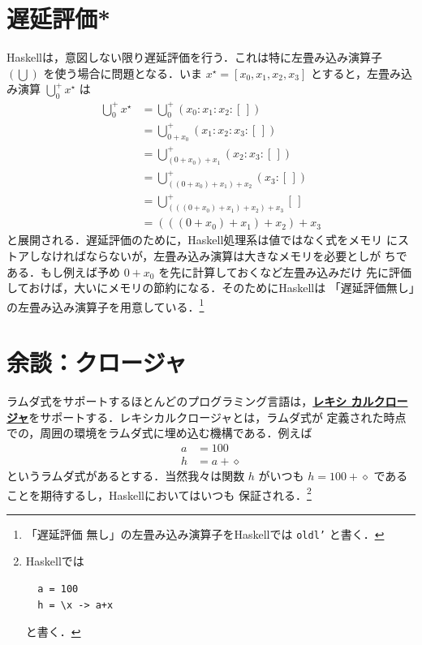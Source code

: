 \documentclass[a5paper,twoside,fleqn,draft]{jsbook}
\newcommand{\programminglanguage}[1]{\textsf{#1}}
\newcommand{\haskell}{\programminglanguage{Haskell}}
\newcommand{\keyword}[1]{{\underline{\textbf{#1}}}}
\newcommand{\code}[1]{\texttt{#1}}
\newcommand{\mEmptyList}{{[\,]}}
\newcommand{\mAnonParam}{\diamond}
\DeclareMathOperator*{\mFold}{\bigcup}
\newcommand{\mList}[1]{{#1}^\mathrm{\star}}
\begin{document}
\section{遅延評価*}

\haskell は，意図しない限り遅延評価を行う．これは特に左畳み込み演算子
$(\mFold)$ を使う場合に問題となる．いま
$\mList{x}=[x_0,x_1,x_2,x_3]$ とすると，左畳み込み演算
$\mFold^+_0\mList{x}$ は
\begin{align}
  \mFold^+_0\mList{x}
  &=\mFold^+_0{}(x_0:x_1:x_2:\mEmptyList)\\
  &=\mFold^+_{0+x_0}{}(x_1:x_2:x_3:\mEmptyList)\\
  &=\mFold^+_{(0+x_0)+x_1}{}(x_2:x_3:\mEmptyList)\\
  &=\mFold^+_{((0+x_0)+x_1)+x_2}{}(x_3:\mEmptyList)\\
  &=\mFold^+_{(((0+x_0)+x_1)+x_2)+x_3}{}\mEmptyList\\
  &=(((0+x_0)+x_1)+x_2)+x_3
\end{align}
と展開される．遅延評価のために，\haskell 処理系は値ではなく式をメモリ
にストアしなければならないが，左畳み込み演算は大きなメモリを必要としが
ちである．もし例えば予め $0+x_0$ を先に計算しておくなど左畳み込みだけ
先に評価しておけば，大いにメモリの節約になる．そのために\haskell は
「遅延評価無し」の左畳み込み演算子を用意している．\footnote{「遅延評価
    無し」の左畳み込み演算子を\haskell では \code{oldl'} と書く．}

%

\section{余談：クロージャ}

ラムダ式をサポートするほとんどのプログラミング言語は，\keyword{レキシ
  カルクロージャ}をサポートする．レキシカルクロージャとは，ラムダ式が
定義された時点での，周囲の環境をラムダ式に埋め込む機構である．例えば
\begin{align}
  a
  &=100\\
  h
  &=a+\mAnonParam
\end{align}
というラムダ式があるとする．当然我々は関数 $h$ がいつも
$h=100+\mAnonParam$ であることを期待するし，\haskell においてはいつも
保証される．\footnote{\haskell では
\begin{verbatim}
  a = 100
  h = \x -> a+x
\end{verbatim}
と書く．}
\end{document}

